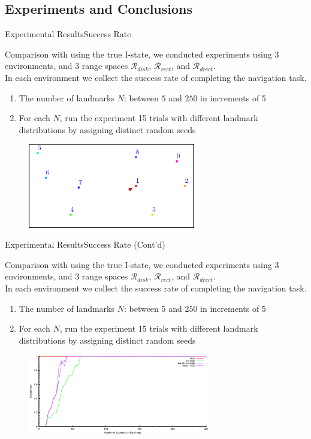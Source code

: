 \documentclass[10pt]{beamer}
\begin{document}

\subsection[Experiments]{Experiments and Conclusions}
\begin{frame}{Experimental Results}{Success Rate}
 \small{Comparison with using the true I-state, we conducted experiments using 3
 environments, and 3 range spaces $\mathcal{R}_{disk}$, $\mathcal{R}_{rect}$,
 and  $\mathcal{R}_{drect}$. \\
 In each environment we collect the success rate of completing the navigation
 task. 
 \begin{enumerate}
 \item The number of landmarks $N$: between $5$ and $250$ in increments of 5
 \item For each $N$, run the experiment 15 trials with different landmark
   distributions by assigning distinct random seeds
 \end{enumerate}
}
\begin{figure}
  \centering
  \includegraphics[width=0.65\textwidth]{figs/blank}
\end{figure}
\end{frame}

\begin{frame}{Experimental Results}{Success Rate (Cont'd)}
 \small{Comparison with using the true I-state, we conducted experiments using 3
 environments, and 3 range spaces $\mathcal{R}_{disk}$, $\mathcal{R}_{rect}$,
 and  $\mathcal{R}_{drect}$. \\
 In each environment we collect the success rate of completing the navigation
 task. 
 \begin{enumerate}
 \item The number of landmarks $N$: between $5$ and $250$ in increments of 5
 \item For each $N$, run the experiment 15 trials with different landmark
   distributions by assigning distinct random seeds
 \end{enumerate}
}
\begin{figure}
  \centering
  \includegraphics[width=0.71\textwidth]{figs/exp_num_blank}
\end{figure}
\end{frame}
\end{document}
